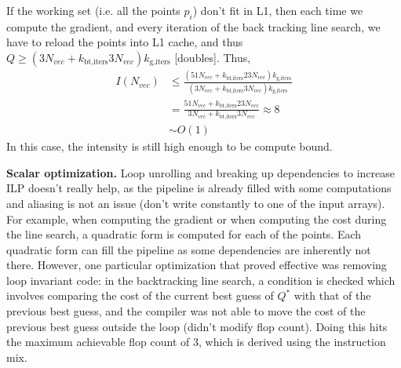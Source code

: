 \documentclass[letterpaper]{article}
\newcommand{\mypar}[1]{{\bf #1.}}
\begin{document}
If the working set (i.e. all the points $p_i$) don't fit in L1, then each time we compute the gradient, and every iteration of the back tracking line search, we have to reload the points into L1 cache, and thus $Q\geq (3N_{vec} + k_\text{bt,iters}3N_{vec})k_\text{g,iters}$ [doubles]. Thus,
\begin{align}
  I(N_{vec}) &\leq \frac{(51N_{vec} + k_\text{bt,iters}23N_{vec})k_\text{g,iters}}{(3N_{vec} + k_\text{bt,iters}3N_{vec})k_\text{g,iters}} \\
  &= \frac{51N_{vec} + k_\text{bt,iters}23N_{vec}}{3N_{vec} + k_\text{bt,iters}3N_{vec}} \approx 8 \\
  &\sim O(1)
\end{align}
In this case, the intensity is still high enough to be compute bound. 

\mypar{Scalar optimization}
Loop unrolling and breaking up dependencies to increase ILP doesn't really help, as the pipeline is already filled with some computations and aliasing is not an issue (don't write constantly to one of the input arrays). For example, when computing the gradient or when computing the cost during the line search, a quadratic form is computed for each of the points. Each quadratic form can fill the pipeline as some dependencies are inherently not there. However, one particular optimization that proved effective was removing loop invariant code: in the backtracking line search, a condition is checked which involves comparing the cost of the current best guess of $Q^*$ with that of the previous best guess, and the compiler was not able to move the cost of the previous best guess outside the loop (didn't modify flop count). Doing this hits the maximum achievable flop count of 3, which is derived using the instruction mix.
\end{document}

